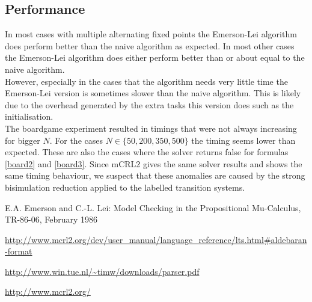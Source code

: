 \documentclass[10pt,a4paper]{article}
\begin{document}
\subsection{Performance}
In most cases with multiple alternating fixed points the Emerson-Lei algorithm does perform better than the naive algorithm as expected. In most other cases the Emerson-Lei algorithm does either perform better than or about equal to the naive algorithm.\\ However, especially in the cases that the algorithm needs very little time the Emerson-Lei version is sometimes slower than the naive algorithm. This is likely due to the overhead generated by the extra tasks this version does such as the initialisation.\\
The boardgame experiment resulted in timings that were not always increasing for bigger $N$. For the cases $N \in \{50, 200, 350, 500\}$ the timing seems lower than expected. These are also the cases where the solver returns false for formulas \ref{board2} and \ref{board3}. Since mCRL2 gives the same solver results and shows the same timing behaviour, we suspect that these anomalies are caused by the strong bisimulation reduction applied to the labelled transition systems.




\begin{thebibliography}{9}
	 E.A. Emerson and C.-L. Lei: Model Checking in the Propositional Mu-Calculus, TR-86-06, February 1986

	 \url{http://www.mcrl2.org/dev/user_manual/language_reference/lts.html#aldebaran-format}
	
	 \url{http://www.win.tue.nl/\~timw/downloads/parser.pdf}

	 \url{http://www.mcrl2.org/}
\end{thebibliography}


\newpage
\appendix
{}
  
\end{document}
